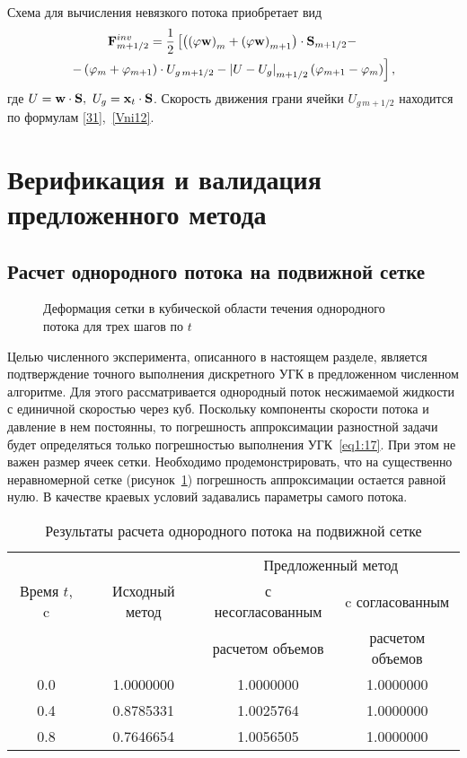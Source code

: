 Схема для вычисления невязкого потока приобретает вид
\begin{gather}
  {\bf{F}}_{m + 1/2}^{inv}  = \frac{1}{2}\left[ \left(
  {\left( {\varphi {\bf{w}}} \right)_m  + \left( {\varphi {\bf{w}}}
  \right)_{m + 1} } \right) \cdot {\bf{S}}_{m + 1/2}-\right. \notag \\
  \left. - \left({\varphi _m  + \varphi _{m + 1} } \right) \cdot U_{g\, m + 1/2} -
  \left| {U - U_g } \right|_{m + 1/2} \left( {\varphi _{m+1} - \varphi _{m} } \right)  \right],
  \label{55}
\end{gather}
где $U = {\bf{w}} \cdot {\bf{S}},\ U_g = {\bf{x}}_t \cdot {\bf{S}}$. Скорость движения грани 
ячейки $U_{g\, m + 1/2}$ находится по формулам \eqref{31},~\eqref{Vni12}.

\section{Верификация и валидация предложенного метода}
\label{s:15}
\subsection{Расчет однородного потока на подвижной сетке}
\label{s:151}
\begin{figure}[b!]
  \label{fig1:2}
  \caption{Деформация сетки в кубической области течения однородного потока для трех шагов по $t$} 
\end{figure}

Целью численного эксперимента, описанного в настоящем разделе, является подтверждение точного выполнения 
дискретного УГК в предложенном численном алгоритме. Для этого рассматривается однородный поток несжимаемой 
жидкости с единичной скоростью через куб. Поскольку компоненты скорости 
потока и давление в нем постоянны, то погрешность аппроксимации разностной задачи будет определяться только 
погрешностью выполнения УГК~\eqref{eq1:17}. При этом не важен размер ячеек сетки. Необходимо 
продемонстрировать, что на существенно неравномерной сетке (рисунок~\ref{fig1:2}) погрешность аппроксимации 
остается равной нулю. В качестве краевых условий задавались параметры самого потока.
\begin{table}[t!]
  \centering
  \caption{Результаты расчета однородного потока на подвижной сетке}
  \vspace{2mm}
  \begin{tabular}{|c|c|c|c|}
  \hline
  &  &\multicolumn{2}{c|}{Предложенный метод} \\
  \cline{3-4}
  {Время $t$, c}&{Исходный метод  \cite{Cher}}  & с несогласованным & c согласованным\\
  &  & расчетом объемов& расчетом объемов\\
  \hline
  0.0 & 1.0000000 & 1.0000000 & 1.0000000  \\
  0.4 & 0.8785331 & 1.0025764 & 1.0000000  \\
  0.8 & 0.7646654 & 1.0056505 & 1.0000000  \\
  \hline
  \end{tabular}
  \label{tab:1}
\end{table}


